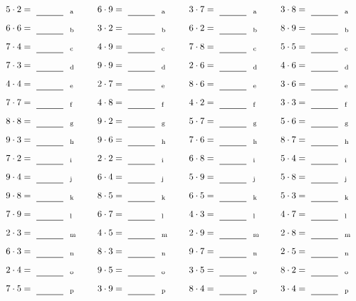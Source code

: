 \documentclass
[
  draft    = true,
  fontsize = 11pt,
  parskip  = half-
]
{scrartcl}
\begin{document}
\par\vfill\par
\begin{align*}
    \pline{5\cdot2}&=\rline{a}
  & \pline{6\cdot9}&=\rline{a}
  & \pline{3\cdot7}&=\rline{a}
  & \pline{3\cdot8}&=\rline{a} \\[1ex]
    \pline{6\cdot6}&=\rline{b}
  & \pline{3\cdot2}&=\rline{b}
  & \pline{6\cdot2}&=\rline{b}
  & \pline{8\cdot9}&=\rline{b} \\[1ex]
    \pline{7\cdot4}&=\rline{c}
  & \pline{4\cdot9}&=\rline{c}
  & \pline{7\cdot8}&=\rline{c}
  & \pline{5\cdot5}&=\rline{c} \\[1ex]
    \pline{7\cdot3}&=\rline{d}
  & \pline{9\cdot9}&=\rline{d}
  & \pline{2\cdot6}&=\rline{d}
  & \pline{4\cdot6}&=\rline{d} \\[1ex]
    \pline{4\cdot4}&=\rline{e}
  & \pline{2\cdot7}&=\rline{e}
  & \pline{8\cdot6}&=\rline{e}
  & \pline{3\cdot6}&=\rline{e} \\[1ex]
    \pline{7\cdot7}&=\rline{f}
  & \pline{4\cdot8}&=\rline{f}
  & \pline{4\cdot2}&=\rline{f}
  & \pline{3\cdot3}&=\rline{f} \\[1ex]
    \pline{8\cdot8}&=\rline{g}
  & \pline{9\cdot2}&=\rline{g}
  & \pline{5\cdot7}&=\rline{g}
  & \pline{5\cdot6}&=\rline{g} \\[1ex]
    \pline{9\cdot3}&=\rline{h}
  & \pline{9\cdot6}&=\rline{h}
  & \pline{7\cdot6}&=\rline{h}
  & \pline{8\cdot7}&=\rline{h} \\[1ex]
    \pline{7\cdot2}&=\rline{i}
  & \pline{2\cdot2}&=\rline{i}
  & \pline{6\cdot8}&=\rline{i}
  & \pline{5\cdot4}&=\rline{i} \\[1ex]
    \pline{9\cdot4}&=\rline{j}
  & \pline{6\cdot4}&=\rline{j}
  & \pline{5\cdot9}&=\rline{j}
  & \pline{5\cdot8}&=\rline{j} \\[1ex]
    \pline{9\cdot8}&=\rline{k}
  & \pline{8\cdot5}&=\rline{k}
  & \pline{6\cdot5}&=\rline{k}
  & \pline{5\cdot3}&=\rline{k} \\[1ex]
    \pline{7\cdot9}&=\rline{l}
  & \pline{6\cdot7}&=\rline{l}
  & \pline{4\cdot3}&=\rline{l}
  & \pline{4\cdot7}&=\rline{l} \\[1ex]
    \pline{2\cdot3}&=\rline{m}
  & \pline{4\cdot5}&=\rline{m}
  & \pline{2\cdot9}&=\rline{m}
  & \pline{2\cdot8}&=\rline{m} \\[1ex]
    \pline{6\cdot3}&=\rline{n}
  & \pline{8\cdot3}&=\rline{n}
  & \pline{9\cdot7}&=\rline{n}
  & \pline{2\cdot5}&=\rline{n} \\[1ex]
    \pline{2\cdot4}&=\rline{o}
  & \pline{9\cdot5}&=\rline{o}
  & \pline{3\cdot5}&=\rline{o}
  & \pline{8\cdot2}&=\rline{o} \\[1ex]
    \pline{7\cdot5}&=\rline{p}
  & \pline{3\cdot9}&=\rline{p}
  & \pline{8\cdot4}&=\rline{p}
  & \pline{3\cdot4}&=\rline{p}
\end{align*}
\end{document}
